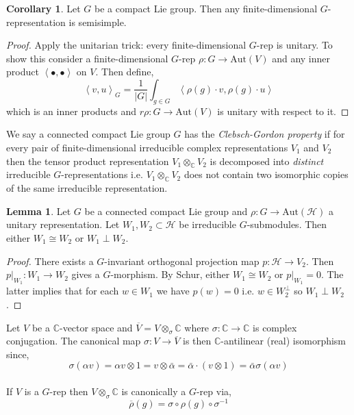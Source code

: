 \documentclass[12pt]{extarticle}
\theoremstyle{definition}
\newtheorem{lemma}[theorem]{Lemma}
\newtheorem{corollary}[theorem]{Corollary}
\newenvironment{definition}[1][Definition:]{\begin{trivlist}
\item[\hskip \labelsep {\bfseries #1}]}{\end{trivlist}}
\newcommand{\Aut}[1]{\mathrm{Aut}\left(#1 \right)}
\newcommand{\C}{\mathbb{C}}
\newcommand{\Hil}{\mathcal{H}}
\newcommand{\inner}[2]{\left< #1, #2 \right>}
\begin{document}
\begin{corollary}
Let $G$ be a compact Lie group. Then any finite-dimensional $G$-representation is semisimple.
\end{corollary}

\begin{proof}
Apply the unitarian trick: every finite-dimensional $G$-rep is unitary. To show this consider a finite-dimensional $G$-rep $\rho : G \to \Aut{V}$ and any inner product $\inner{\bullet}{\bullet}$ on $V$. Then define,
\[ \inner{v}{u}_G = \frac{1}{|G|} \int_{g \in G} \inner{\rho(g) \cdot v}{ \rho(g) \cdot u} \]
which is an inner products and $r\rho : G \to \Aut{V}$ is unitary with respect to it.
\end{proof}

\begin{definition}
We say a connected compact Lie group $G$ has the \textit{Clebsch-Gordon property} if for every pair of finite-dimensional irreducible complex representations $V_1$ and $V_2$ then the tensor product representation $V_1 \otimes_\C V_2$ is decomposed into \textit{distinct} irreducible $G$-representations i.e. $V_1 \otimes_\C V_2$ does not contain two isomorphic copies of the same irreducible representation.
\end{definition}

\begin{lemma}
Let $G$ be a connected compact Lie group and $\rho : G \to \Aut{\Hil}$ a unitary representation. Let $W_1, W_2 \subset \Hil$ be irreducible $G$-submodules. Then either $W_1 \cong W_2$ or $W_1 \perp W_2$. 
\end{lemma}

\begin{proof}
There exists a $G$-invariant orthogonal projection map $p : \Hil \to V_2$. Then $p |_{W_1} : W_1 \to W_2$ gives a $G$-morphism. By Schur, either $W_1 \cong W_2$ or $p|_{W_1} = 0$. The latter implies that for each $w \in W_1$ we have $p(w) = 0$ i.e. $w \in W_2^\perp$ so $W_1 \perp W_2$. 
\end{proof}

\begin{definition}
Let $V$ be a $\C$-vector space and $\overline{V} = V \otimes_\sigma \C$ where $\sigma : \C \to \C$ is complex conjugation. The canonical map $\sigma : V \to \overline{V}$ is then $\C$-antilinear (real) isomorphism since, 
\[ \sigma(\alpha v) = \alpha v \otimes 1 =  v \otimes \bar{\alpha} = \bar{\alpha} \cdot (v \otimes 1) = \bar{\alpha} \sigma(\alpha v) \]
\bigskip\\
If $V$ is a $G$-rep then $V \otimes_\sigma \C$ is canonically a $G$-rep via,
\[ \overline{\rho}(g) = \sigma \circ \rho(g) \circ \sigma^{-1} \] 
\end{definition}
\end{document}

